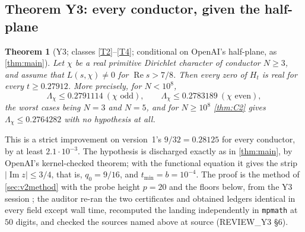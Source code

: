 \documentclass[11pt]{article}
\newtheorem{theorem}{Theorem}[section]
\theoremstyle{definition}
\newcommand{\lean}[1]{\texttt{#1}}
\newcommand{\re}{\operatorname{Re}}
\newcommand{\im}{\operatorname{Im}}
\newcommand{\Lc}{\Lambda}
\begin{document}
\subsection{Theorem Y3: every conductor, given the half-plane}\label{sec:Y3}

\begin{theorem}[Y3; classes \ref{T2}--\ref{T4}; conditional on OpenAI's half-plane, as \cref{thm:main}]\label{thm:Y3}
Let $\chi$ be a real primitive Dirichlet character of conductor $N \ge 3$, and assume that $L(s,\chi) \ne 0$ for $\re s > 7/8$. Then every zero of $H_t$ is real for every $t \ge 0.27912$. More precisely, for $N < 10^8$,
\[
\Lc_\chi \le 0.2791114 \ (\chi \text{ odd}),\qquad \Lc_\chi \le 0.2783189 \ (\chi \text{ even}),
\]
the worst cases being $N = 3$ and $N = 5$, and for $N \ge 10^8$ \cref{thm:C2} gives $\Lc_\chi \le 0.2764282$ with no hypothesis at all.
\end{theorem}

\noindent
This is a strict improvement on version~1's $9/32 = 0.28125$ for every conductor, by at least $2.1\cdot10^{-3}$. The hypothesis is discharged exactly as in \cref{thm:main}, by OpenAI's kernel-checked theorem; with the functional equation it gives the strip $|\im z| \le 3/4$, that is, $q_0 = 9/16$, and $t_{\min} = b = 10^{-4}$. The proof is the method of \cref{sec:v2method} with the probe height $p = 20$ and the floors below, from the Y3 session \cite[Y3 memo \S3]{dq1records}; the auditor re-ran the two certificates and obtained ledgers identical in every field except wall time, recomputed the landing independently in \lean{mpmath} at $50$ digits, and checked the sources named above at source (REVIEW\_Y3 \S6).
\end{document}
